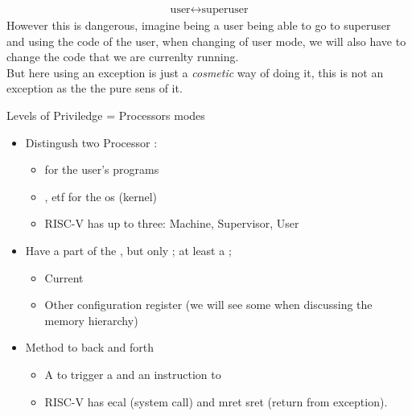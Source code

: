 \begin{align*} \text{user} \longleftrightarrow \text{superuser}   \end{align*}
However this is dangerous, imagine being a user being able to go to superuser and using the code of the user, when changing of user mode, we will also have to change the code that we are currenlty running.\\
But here using an exception is just a \textit{cosmetic} way of doing it, this is not an exception as the the pure sens of it.
\begin{parag}{Levels of Priviledge = Processors modes}%
\begin{itemize}
    \item Distingush  two Processor  :
		\begin{itemize}
		    \item {} for the user's programs 
		    \item {}, etf for the os (kernel)
		    \item RISC-V has up to three: Machine, Supervisor, User
		\end{itemize}
		\item Have a part of the , but only ; at least a ;
			\begin{itemize}
			    \item Current 
			    \item Other configuration register (we will see some when discussing the memory hierarchy)
			\end{itemize}
			\item Method to  back and forth
				\begin{itemize}
					\item A  to trigger a  and an instruction to 
					\item RISC-V has ecal (system call) and mret sret (return from exception).
				\end{itemize}
\end{itemize}
\end{parag}
